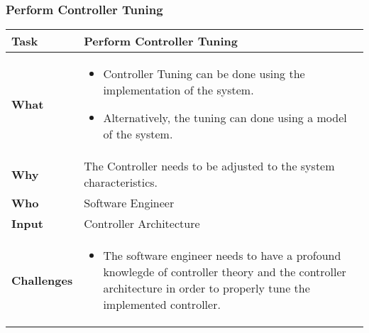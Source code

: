 \subsubsection{Perform Controller Tuning}
\begin{minipage}{\textwidth}
	 \label{table:ch6_Task_Perform_Controller_Tuning} 
	\begin{tabular}
		{|m{3cm}|m{10cm}|} \hline \bfseries Task & Perform Controller Tuning\\
		\hline \bfseries What & 
		\begin{itemize}
			\item Controller Tuning can be done using the implementation of the system.
			\item Alternatively, the tuning can done using a model of the system.
		\end{itemize}
		\\
		\hline \bfseries Why & The Controller needs to be adjusted to the system characteristics.\\
		\hline \bfseries Who & Software Engineer\\
		\hline \bfseries Input & Controller Architecture\\
		\hline \bfseries Challenges & 
		\begin{itemize}
			\item The software engineer needs to have a profound knowlegde of controller theory and the controller architecture in order to properly tune the implemented controller.
		\end{itemize}
		\\
		\hline 
	\end{tabular}
\end{minipage}

